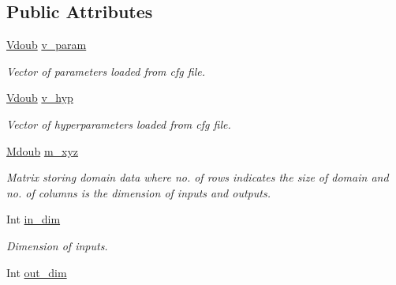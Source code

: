 \subsection*{Public Attributes}
\begin{DoxyCompactItemize}
\item 
\hypertarget{classpgpr__parse_aa2dc5cb24f1a14e11db04e129c070697}{\hyperlink{classpgpr__vector}{Vdoub} \hyperlink{classpgpr__parse_aa2dc5cb24f1a14e11db04e129c070697}{v\+\_\+param}}\label{classpgpr__parse_aa2dc5cb24f1a14e11db04e129c070697}

\begin{DoxyCompactList}\small\item\em Vector of parameters loaded from cfg file. \end{DoxyCompactList}\item 
\hypertarget{classpgpr__parse_afca0013fbaf5205abef333d22f0bcdf4}{\hyperlink{classpgpr__vector}{Vdoub} \hyperlink{classpgpr__parse_afca0013fbaf5205abef333d22f0bcdf4}{v\+\_\+hyp}}\label{classpgpr__parse_afca0013fbaf5205abef333d22f0bcdf4}

\begin{DoxyCompactList}\small\item\em Vector of hyperparameters loaded from cfg file. \end{DoxyCompactList}\item 
\hypertarget{classpgpr__parse_ad68cc51bfd6c7c8193039f51b641e01d}{\hyperlink{classpgpr__matrix}{Mdoub} \hyperlink{classpgpr__parse_ad68cc51bfd6c7c8193039f51b641e01d}{m\+\_\+xyz}}\label{classpgpr__parse_ad68cc51bfd6c7c8193039f51b641e01d}

\begin{DoxyCompactList}\small\item\em Matrix storing domain data where no. of rows indicates the size of domain and no. of columns is the dimension of inputs and outputs. \end{DoxyCompactList}\item 
\hypertarget{classpgpr__parse_a24a21542be9a07d290aed66f90997031}{Int \hyperlink{classpgpr__parse_a24a21542be9a07d290aed66f90997031}{in\+\_\+dim}}\label{classpgpr__parse_a24a21542be9a07d290aed66f90997031}

\begin{DoxyCompactList}\small\item\em Dimension of inputs. \end{DoxyCompactList}\item 
\hypertarget{classpgpr__parse_ae1fab280bf9c33d950d41f3c962fe8f0}{Int \hyperlink{classpgpr__parse_ae1fab280bf9c33d950d41f3c962fe8f0}{out\+\_\+dim}}\label{classpgpr__parse_ae1fab280bf9c33d950d41f3c962fe8f0}


\end{DoxyCompactItemize}
